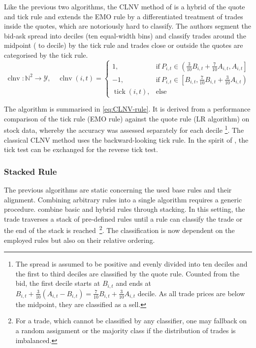 Like the previous two algorithms, the \gls{CLNV} method of \textcite[][3809]{chakrabartyTradeClassificationAlgorithms2012} is a hybrid of the quote and tick rule and extends the \gls{EMO} rule by a differentiated treatment of trades inside the quotes, which are notoriously hard to classify. The authors segment the bid-ask spread into deciles (ten equal-width bins) and classify trades around the midpoint ( to  decile) by the tick rule and trades close or outside the quotes are categorised by the tick rule.
\begin{equation}
    \operatorname{clnv} \colon \mathbb{N}^2 \to \mathcal{Y}, \quad
    \operatorname{clnv}(i, t)=
    \begin{cases}
        1,                         & \mathrm{if}\ P_{i, t} \in \left(\frac{3}{10} B_{i,t} + \frac{7}{10} A_{i,t}, A_{i, t}\right] \\
        -1,                        & \mathrm{if}\ P_{i, t} \in \left[ B_{i,t}, \frac{7}{10} B_{i,t} + \frac{3}{10} A_{i,t}\right) \\
        \operatorname{tick}(i, t), & \mathrm{else}
    \end{cases}
    \label{eq:CLNV-rule}
\end{equation}

The algorithm is summarised in \cref{eq:CLNV-rule}. It is derived from a performance comparison of the tick rule (\gls{EMO} rule) against the quote rule (\gls{LR} algorithm) on stock data, whereby the accuracy was assessed separately for each decile \footnote{The spread is assumed to be positive and evenly divided into ten deciles and the first to third deciles are classified by the quote rule. Counted from the bid, the first decile starts at $B_{i,t}$ and ends at $B_{i,t} + \tfrac{3}{10} (A_{i,t} - B_{i,t}) = \tfrac{7}{10} B_{i,t} + \tfrac{3}{10} A_{i,t}$  decile. As all trade prices are below the midpoint, they are classified as a sell.}. The classical \gls{CLNV} method uses the backward-looking tick rule. In the spirit of \textcite[][735]{leeInferringTradeDirection1991}, the tick test can be exchanged for the reverse tick test.

\subsubsection{Stacked Rule}\label{sec:stacked-rule}

The previous algorithms are static concerning the used base rules and their alignment. Combining arbitrary rules into a single algorithm requires a generic procedure. \textcite[][18]{grauerOptionTradeClassification2022} combine basic and hybrid rules through stacking. In this setting, the trade traverses a stack of pre-defined rules until a rule can classify the trade or the end of the stack is reached~\footnote{For a trade, which cannot be classified by any classifier, one may fallback on a random assignment or the majority class if the distribution of trades is imbalanced.}. The classification is now dependent on the employed rules but also on their relative ordering.

